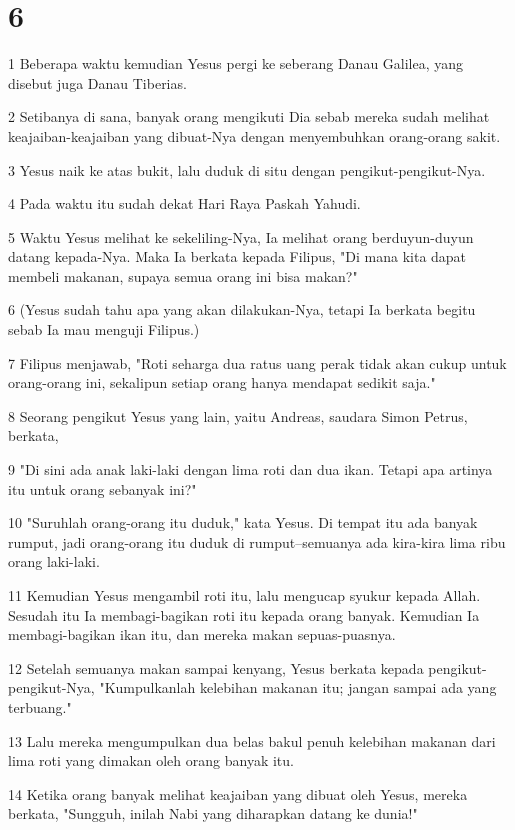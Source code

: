 \chapter{6}

\par 1 Beberapa waktu kemudian Yesus pergi ke seberang Danau Galilea, yang disebut juga Danau Tiberias.
\par 2 Setibanya di sana, banyak orang mengikuti Dia sebab mereka sudah melihat keajaiban-keajaiban yang dibuat-Nya dengan menyembuhkan orang-orang sakit.
\par 3 Yesus naik ke atas bukit, lalu duduk di situ dengan pengikut-pengikut-Nya.
\par 4 Pada waktu itu sudah dekat Hari Raya Paskah Yahudi.
\par 5 Waktu Yesus melihat ke sekeliling-Nya, Ia melihat orang berduyun-duyun datang kepada-Nya. Maka Ia berkata kepada Filipus, "Di mana kita dapat membeli makanan, supaya semua orang ini bisa makan?"
\par 6 (Yesus sudah tahu apa yang akan dilakukan-Nya, tetapi Ia berkata begitu sebab Ia mau menguji Filipus.)
\par 7 Filipus menjawab, "Roti seharga dua ratus uang perak tidak akan cukup untuk orang-orang ini, sekalipun setiap orang hanya mendapat sedikit saja."
\par 8 Seorang pengikut Yesus yang lain, yaitu Andreas, saudara Simon Petrus, berkata,
\par 9 "Di sini ada anak laki-laki dengan lima roti dan dua ikan. Tetapi apa artinya itu untuk orang sebanyak ini?"
\par 10 "Suruhlah orang-orang itu duduk," kata Yesus. Di tempat itu ada banyak rumput, jadi orang-orang itu duduk di rumput--semuanya ada kira-kira lima ribu orang laki-laki.
\par 11 Kemudian Yesus mengambil roti itu, lalu mengucap syukur kepada Allah. Sesudah itu Ia membagi-bagikan roti itu kepada orang banyak. Kemudian Ia membagi-bagikan ikan itu, dan mereka makan sepuas-puasnya.
\par 12 Setelah semuanya makan sampai kenyang, Yesus berkata kepada pengikut-pengikut-Nya, "Kumpulkanlah kelebihan makanan itu; jangan sampai ada yang terbuang."
\par 13 Lalu mereka mengumpulkan dua belas bakul penuh kelebihan makanan dari lima roti yang dimakan oleh orang banyak itu.
\par 14 Ketika orang banyak melihat keajaiban yang dibuat oleh Yesus, mereka berkata, "Sungguh, inilah Nabi yang diharapkan datang ke dunia!"
